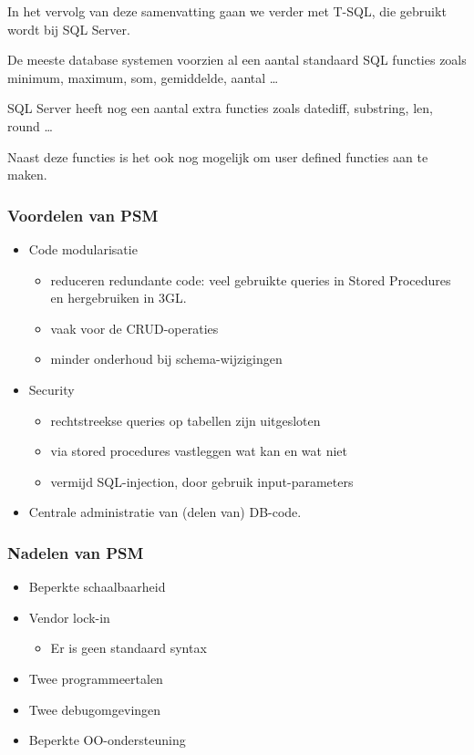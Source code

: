 \documentclass[a4paper,12pt]{article}
\begin{document}
In het vervolg van deze samenvatting gaan we verder met T-SQL, die gebruikt wordt bij SQL Server.

De meeste database systemen voorzien al een aantal standaard SQL functies zoals minimum, maximum, som, gemiddelde, aantal \dots

SQL Server heeft nog een aantal extra functies zoals datediff, substring, len, round \dots

Naast deze functies is het ook nog mogelijk om user defined functies aan te maken.

\subsubsection{Voordelen van PSM}
\begin{itemize}
\item Code modularisatie
	\begin{itemize}
	\item reduceren redundante code: veel gebruikte queries in Stored Procedures en hergebruiken in 3GL.
	\item vaak voor de CRUD-operaties
	\item minder onderhoud bij schema-wijzigingen
	\end{itemize}
\item Security
	\begin{itemize}
	\item rechtstreekse queries op tabellen zijn uitgesloten
	\item via stored procedures vastleggen wat kan en wat niet
	\item vermijd SQL-injection, door gebruik input-parameters
	\end{itemize}
\item Centrale administratie van (delen van) DB-code.
\end{itemize}

\subsubsection{Nadelen van PSM}
\begin{itemize}
\item Beperkte schaalbaarheid
\item Vendor lock-in
	\begin{itemize}
	\item Er is geen standaard syntax
	\end{itemize}
\item Twee programmeertalen
\item Twee debugomgevingen
\item Beperkte OO-ondersteuning
\end{itemize}
\end{document}
